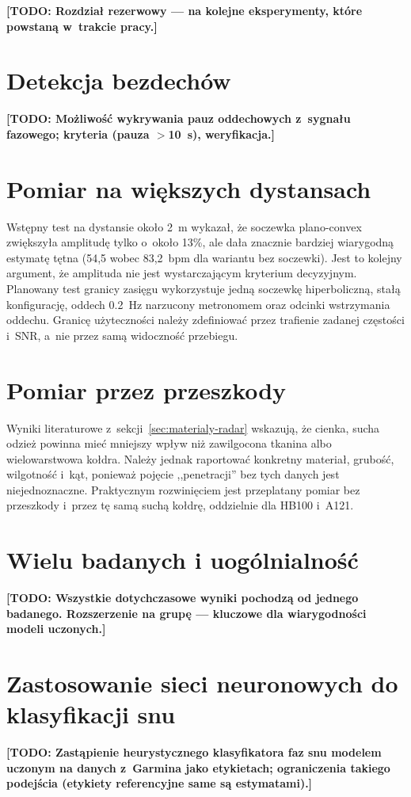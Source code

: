 \documentclass[12pt,a4paper,oneside]{report}
\newcommand{\todo}[1]{\textcolor{red!75!black}{\textbf{[TODO: #1]}}}
\newcommand{\miejsce}[1]{\todo{#1}}
\begin{document}
\todo{Rozdział rezerwowy --- na kolejne eksperymenty, które powstaną
w~trakcie pracy.}

\section{Detekcja bezdechów}
\miejsce{Możliwość wykrywania pauz oddechowych z~sygnału fazowego;
kryteria (pauza $>$\SI{10}{s}), weryfikacja.}

\section{Pomiar na większych dystansach}
Wstępny test na dystansie około \SI{2}{m} wykazał, że soczewka
plano-convex zwiększyła amplitudę tylko o~około 13\%, ale dała znacznie
bardziej wiarygodną estymatę tętna (54,5 wobec 83,2~bpm dla wariantu bez
soczewki). Jest to kolejny argument, że amplituda nie jest wystarczającym
kryterium decyzyjnym. Planowany test granicy zasięgu wykorzystuje jedną
soczewkę hiperboliczną, stałą konfigurację, oddech \SI{0.2}{Hz} narzucony
metronomem oraz odcinki wstrzymania oddechu. Granicę użyteczności należy
zdefiniować przez trafienie zadanej częstości i~SNR, a~nie przez samą
widoczność przebiegu.

\section{Pomiar przez przeszkody}
Wyniki literaturowe z~sekcji~\ref{sec:materialy-radar} wskazują, że cienka,
sucha odzież powinna mieć mniejszy wpływ niż zawilgocona tkanina albo
wielowarstwowa kołdra. Należy jednak raportować konkretny materiał, grubość,
wilgotność i~kąt, ponieważ pojęcie ,,penetracji'' bez tych danych jest
niejednoznaczne. Praktycznym rozwinięciem jest przeplatany pomiar bez
przeszkody i~przez tę samą suchą kołdrę, oddzielnie dla HB100 i~A121.

\section{Wielu badanych i uogólnialność}
\miejsce{Wszystkie dotychczasowe wyniki pochodzą od jednego badanego.
Rozszerzenie na grupę --- kluczowe dla wiarygodności modeli uczonych.}

\section{Zastosowanie sieci neuronowych do klasyfikacji snu}
\miejsce{Zastąpienie heurystycznego klasyfikatora faz snu modelem uczonym na
danych z~Garmina jako etykietach; ograniczenia takiego podejścia (etykiety
referencyjne same są estymatami).}
\end{document}
